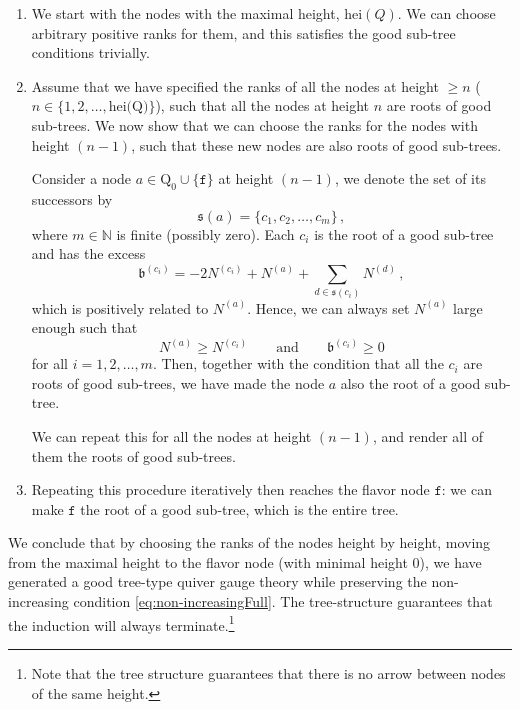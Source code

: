 \documentclass[12pt,a4paper]{article}
\renewcommand{\(}{\left(}
\renewcommand{\)}{\right)}
\renewcommand{\(}{\left(}
\renewcommand{\)}{\right)}
\begin{document}
\begin{enumerate}
\item We start with the nodes with the maximal height, $\textrm{hei}(Q)$. 
We can choose arbitrary positive ranks for them, and this satisfies the good sub-tree conditions trivially. 

\item Assume that we have specified the ranks of all the nodes at height $\geq n$ ($n\in\{1,2,\dots,\textrm{hei(Q)}\}$), such that all the nodes at height $n$ are roots of good sub-trees.
We now show that we can choose the ranks for the nodes with height $(n-1)$, such that these new nodes are also roots of good sub-trees.


Consider a node $a\in \textrm{Q}_0\cup\{\mathtt{f}\}$ at height $(n-1)$, we denote the set of its successors by
\begin{equation}
\mathfrak{s}(a)=\{c_1,c_2,\dots,c_m\}\,,
\end{equation}
where $m\in\mathbb{N}$ is finite (possibly zero).
Each $c_i$ is the root of a good sub-tree and has the excess
\begin{equation}
\mathfrak{b}^{(c_i)}
=-2N^{(c_i)}+N^{(a)}+\sum_{d\in \mathfrak{s}(c_i)}N^{(d)}\,,
\end{equation}
which is positively related to $N^{(a)}$. 
Hence, we can always set $N^{(a)}$ large enough such that
\begin{equation}
N^{(a)}\geq N^{(c_i)}
\qquad\textrm{and}\qquad \mathfrak{b}^{(c_i)}\geq 0 
\end{equation}
for all $i=1,2,\dots,m$.
Then, together with the condition that all the $c_i$ are roots of good sub-trees, we have made the node $a$ also the root of a good sub-tree.

We can repeat this for all the nodes at height $(n-1)$, and render all of them the roots of good sub-trees.




\item Repeating this procedure iteratively then reaches the flavor node $\mathtt{f}$: we can make $\mathtt{f}$ the root of a good sub-tree, which is the entire tree.




\end{enumerate}
We conclude that by choosing the ranks of the nodes height by height, moving from the maximal height to the flavor node (with minimal height $0$), we have generated a good tree-type quiver gauge theory while preserving the non-increasing condition \eqref{eq:non-increasingFull}. 
The tree-structure guarantees that the induction will always terminate.\footnote{Note that the tree structure guarantees that there is no arrow between nodes of the same height. 
}
\end{document}
